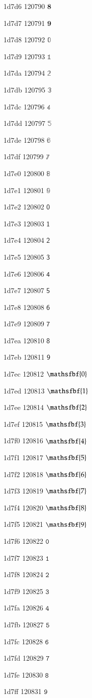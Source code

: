 \documentclass[11pt]{article}
\begin{document}
1d7d6 120790 \ensuremath{\mathbf{8}}

1d7d7 120791 \ensuremath{\mathbf{9}}

1d7d8 120792 \ensuremath{\mathbb{0}}

1d7d9 120793 \ensuremath{\mathbb{1}}

1d7da 120794 \ensuremath{\mathbb{2}}

1d7db 120795 \ensuremath{\mathbb{3}}

1d7dc 120796 \ensuremath{\mathbb{4}}

1d7dd 120797 \ensuremath{\mathbb{5}}

1d7de 120798 \ensuremath{\mathbb{6}}

1d7df 120799 \ensuremath{\mathbb{7}}

1d7e0 120800 \ensuremath{\mathbb{8}}

1d7e1 120801 \ensuremath{\mathbb{9}}

1d7e2 120802 \ensuremath{\mathsf{0}}

1d7e3 120803 \ensuremath{\mathsf{1}}

1d7e4 120804 \ensuremath{\mathsf{2}}

1d7e5 120805 \ensuremath{\mathsf{3}}

1d7e6 120806 \ensuremath{\mathsf{4}}

1d7e7 120807 \ensuremath{\mathsf{5}}

1d7e8 120808 \ensuremath{\mathsf{6}}

1d7e9 120809 \ensuremath{\mathsf{7}}

1d7ea 120810 \ensuremath{\mathsf{8}}

1d7eb 120811 \ensuremath{\mathsf{9}}

1d7ec 120812 \ensuremath{\mathsfbf{0}}

1d7ed 120813 \ensuremath{\mathsfbf{1}}

1d7ee 120814 \ensuremath{\mathsfbf{2}}

1d7ef 120815 \ensuremath{\mathsfbf{3}}

1d7f0 120816 \ensuremath{\mathsfbf{4}}

1d7f1 120817 \ensuremath{\mathsfbf{5}}

1d7f2 120818 \ensuremath{\mathsfbf{6}}

1d7f3 120819 \ensuremath{\mathsfbf{7}}

1d7f4 120820 \ensuremath{\mathsfbf{8}}

1d7f5 120821 \ensuremath{\mathsfbf{9}}

1d7f6 120822 \ensuremath{\mathtt{0}}

1d7f7 120823 \ensuremath{\mathtt{1}}

1d7f8 120824 \ensuremath{\mathtt{2}}

1d7f9 120825 \ensuremath{\mathtt{3}}

1d7fa 120826 \ensuremath{\mathtt{4}}

1d7fb 120827 \ensuremath{\mathtt{5}}

1d7fc 120828 \ensuremath{\mathtt{6}}

1d7fd 120829 \ensuremath{\mathtt{7}}

1d7fe 120830 \ensuremath{\mathtt{8}}

1d7ff 120831 \ensuremath{\mathtt{9}}
\end{document}
